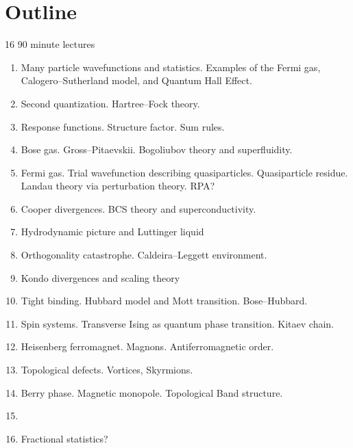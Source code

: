 \section{Outline}

16 90 minute lectures

\begin{enumerate}
\item Many particle wavefunctions and statistics. Examples of the Fermi gas, Calogero--Sutherland model, and Quantum Hall Effect.

\item Second quantization. Hartree--Fock theory.

\item Response functions. Structure factor. Sum rules. 

\item Bose gas. Gross--Pitaevskii. Bogoliubov theory and superfluidity.

\item Fermi gas. Trial wavefunction describing quasiparticles. Quasiparticle residue. Landau theory via perturbation theory. RPA?

\item Cooper divergences. BCS theory and superconductivity. 

\item Hydrodynamic picture and Luttinger liquid

\item Orthogonality catastrophe. Caldeira--Leggett environment.

\item Kondo divergences and scaling theory

\item Tight binding. Hubbard model and Mott transition. Bose--Hubbard.

\item Spin systems. Transverse Ising as quantum phase transition. Kitaev chain.

\item Heisenberg ferromagnet. Magnons. Antiferromagnetic order.

\item Topological defects. Vortices, Skyrmions. 

\item Berry phase. Magnetic monopole. Topological Band structure.

\item 

\item Fractional statistics?
\end{enumerate}